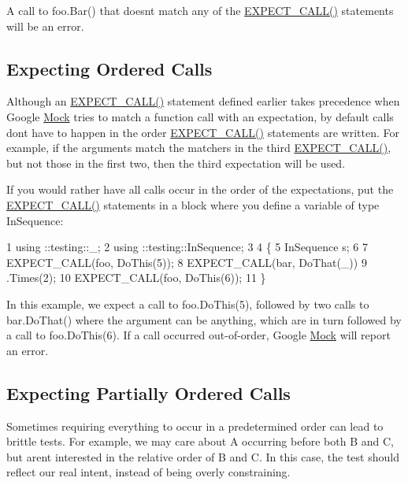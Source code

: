 A call to {\ttfamily foo.\+Bar()} that doesn\textquotesingle{}t match any of the {\ttfamily \hyperlink{gmock-spec-builders_8h_a535a6156de72c1a2e25a127e38ee5232}{E\+X\+P\+E\+C\+T\+\_\+\+C\+A\+L\+L()}} statements will be an error.

\subsection*{Expecting Ordered Calls}

Although an {\ttfamily \hyperlink{gmock-spec-builders_8h_a535a6156de72c1a2e25a127e38ee5232}{E\+X\+P\+E\+C\+T\+\_\+\+C\+A\+L\+L()}} statement defined earlier takes precedence when Google \hyperlink{classMock}{Mock} tries to match a function call with an expectation, by default calls don\textquotesingle{}t have to happen in the order {\ttfamily \hyperlink{gmock-spec-builders_8h_a535a6156de72c1a2e25a127e38ee5232}{E\+X\+P\+E\+C\+T\+\_\+\+C\+A\+L\+L()}} statements are written. For example, if the arguments match the matchers in the third {\ttfamily \hyperlink{gmock-spec-builders_8h_a535a6156de72c1a2e25a127e38ee5232}{E\+X\+P\+E\+C\+T\+\_\+\+C\+A\+L\+L()}}, but not those in the first two, then the third expectation will be used.

If you would rather have all calls occur in the order of the expectations, put the {\ttfamily \hyperlink{gmock-spec-builders_8h_a535a6156de72c1a2e25a127e38ee5232}{E\+X\+P\+E\+C\+T\+\_\+\+C\+A\+L\+L()}} statements in a block where you define a variable of type {\ttfamily In\+Sequence}\+:


\begin{DoxyCode}
1 using ::testing::\_;
2 using ::testing::InSequence;
3 
4 \{
5   InSequence s;
6 
7   EXPECT\_CALL(foo, DoThis(5));
8   EXPECT\_CALL(bar, DoThat(\_))
9       .Times(2);
10   EXPECT\_CALL(foo, DoThis(6));
11 \}
\end{DoxyCode}


In this example, we expect a call to {\ttfamily foo.\+Do\+This(5)}, followed by two calls to {\ttfamily bar.\+Do\+That()} where the argument can be anything, which are in turn followed by a call to {\ttfamily foo.\+Do\+This(6)}. If a call occurred out-\/of-\/order, Google \hyperlink{classMock}{Mock} will report an error.

\subsection*{Expecting Partially Ordered Calls}

Sometimes requiring everything to occur in a predetermined order can lead to brittle tests. For example, we may care about {\ttfamily A} occurring before both {\ttfamily B} and {\ttfamily C}, but aren\textquotesingle{}t interested in the relative order of {\ttfamily B} and {\ttfamily C}. In this case, the test should reflect our real intent, instead of being overly constraining.

